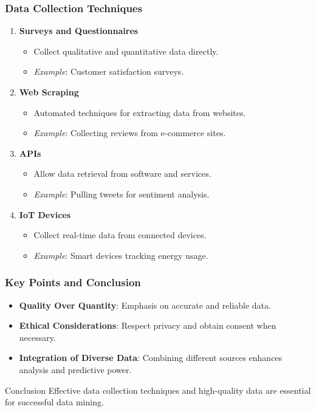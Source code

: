\documentclass[aspectratio=169]{beamer}
\begin{document}
\begin{frame}[fragile]
    \frametitle{Data Collection Techniques}
    \begin{enumerate}
        \item \textbf{Surveys and Questionnaires}
            \begin{itemize}
                \item Collect qualitative and quantitative data directly.
                \item \textit{Example}: Customer satisfaction surveys.
            \end{itemize}
        
        \item \textbf{Web Scraping}
            \begin{itemize}
                \item Automated techniques for extracting data from websites.
                \item \textit{Example}: Collecting reviews from e-commerce sites.
            \end{itemize}
        
        \item \textbf{APIs}
            \begin{itemize}
                \item Allow data retrieval from software and services.
                \item \textit{Example}: Pulling tweets for sentiment analysis.
            \end{itemize}
        
        \item \textbf{IoT Devices}
            \begin{itemize}
                \item Collect real-time data from connected devices.
                \item \textit{Example}: Smart devices tracking energy usage.
            \end{itemize}
    \end{enumerate}
\end{frame}

\begin{frame}[fragile]
    \frametitle{Key Points and Conclusion}
    \begin{itemize}
        \item \textbf{Quality Over Quantity}: Emphasis on accurate and reliable data.
        \item \textbf{Ethical Considerations}: Respect privacy and obtain consent when necessary.
        \item \textbf{Integration of Diverse Data}: Combining different sources enhances analysis and predictive power.
    \end{itemize}
    \begin{block}{Conclusion}
        Effective data collection techniques and high-quality data are essential for successful data mining.
    \end{block}
\end{frame}
\end{document}
